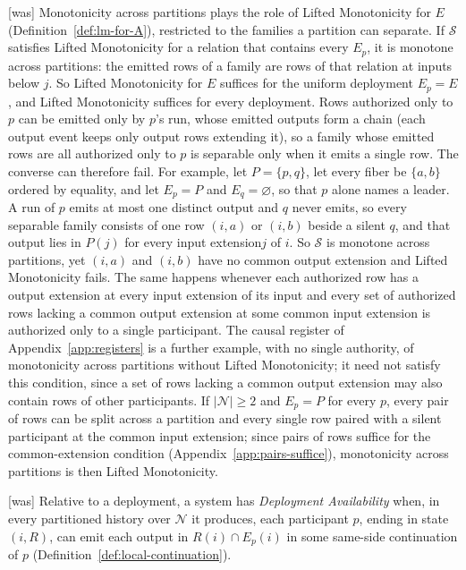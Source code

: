 \documentclass[sigconf]{cidr-2027}
\theoremstyle{remark}
\newcommand{\indesc}{input extension\xspace} %
\newcommand{\outnoun}{output extension\xspace}%
\newcommand{\Spec}{\mathcal{S}}
\newcommand{\fiber}[1]{P(#1)}
\begin{document}
{\footnotesize\color{black!50}\noindent\textsf{[was]} Monotonicity across partitions plays the role of Lifted Monotonicity for $E$
(Definition~\ref{def:lm-for-A}), restricted to the families a
partition can separate.  If $\Spec$ satisfies Lifted Monotonicity for a relation that contains
every $E_p$, it is monotone across partitions: the emitted rows of a family are
rows of that relation at inputs below $j$.  So Lifted Monotonicity for $E$ suffices for
the uniform deployment $E_p=E$, and Lifted Monotonicity suffices for every
deployment.  Rows authorized only to $p$ can be emitted only by $p$'s run,
whose emitted outputs form a chain (each output event keeps only output rows extending
it), so a family whose emitted rows are all authorized only to $p$ is
separable only when it emits a single row.  The converse can therefore fail.
For example, let $P=\{p,q\}$, let every fiber be $\{a,b\}$ ordered by equality,
and let $E_p=P$ and $E_q=\varnothing$, so that $p$ alone names a leader.  A run
of $p$ emits at most one distinct output and $q$ never emits, so every separable
family consists of one row $(i,a)$ or $(i,b)$ beside a silent $q$, and that
output lies in $\fiber{j}$ for every \indesc $j$ of $i$.  So $\Spec$ is
monotone across partitions, yet $(i,a)$ and $(i,b)$ have no common \outnoun and
Lifted Monotonicity fails.  The same happens whenever each authorized row has a
\outnoun at every \indesc of its input and every set of authorized rows
lacking a common \outnoun at some common \indesc is authorized only to a single
participant.  The causal register of Appendix~\ref{app:registers} is a further
example, with no single authority, of monotonicity across partitions without
Lifted Monotonicity; it need not satisfy this condition, since a set of rows lacking
a common \outnoun may also contain rows of other participants.  If
$|\mathcal N|\ge2$ and $E_p=P$ for every $p$, every pair of rows can be split across a
partition and every single row paired with a silent participant at the common
\indesc; since pairs of rows suffice for the common-extension condition
(Appendix~\ref{app:pairs-suffice}), monotonicity across partitions is then
Lifted Monotonicity.\par}



{\footnotesize\color{black!50}\noindent\textsf{[was]} Relative to a deployment, a system has \emph{Deployment Availability} when, in
every partitioned history over $\mathcal N$ it produces, each participant $p$, ending in
state $(i,R)$, can emit each output in $R(i)\cap E_p(i)$ in some same-side
continuation of $p$ (Definition~\ref{def:local-continuation}).\par}
\end{document}
